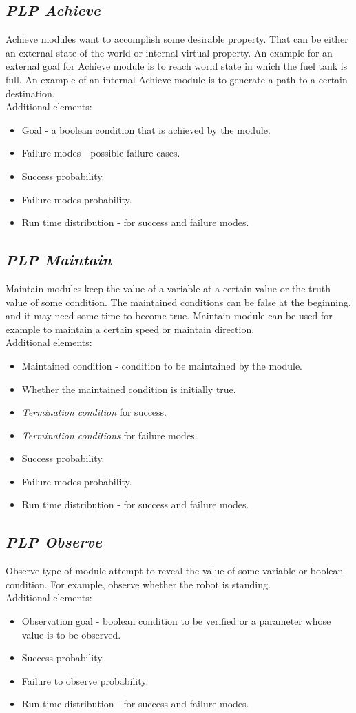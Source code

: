 \subsection{\textit{PLP Achieve} \label{plp_achieve}}
Achieve modules want to accomplish some desirable property. That can be either an external state of the world or internal virtual property. An example for an external goal for Achieve module is to reach world state in which the fuel tank is full. An example of an internal Achieve module is to generate a path to a certain destination.\\
Additional elements:
\begin{itemize}
\item Goal - a boolean condition that is achieved by the module.
\item Failure modes - possible failure cases.
\item Success probability.
\item Failure modes probability.
\item Run time distribution - for success and failure modes.
\end{itemize}
\subsection{\textit{PLP Maintain}  \label{plp_maintain}}
Maintain modules keep the value of a variable at a certain value or the truth value of some condition. The maintained conditions can be false at the beginning, and it may need some time to become true. Maintain module can be used for example to maintain a certain speed or maintain direction.\\
Additional elements:
\begin{itemize}
\item Maintained condition - condition to be maintained by the module.
\item Whether the maintained condition is initially true. 
\item \textit{Termination condition} for success.
\item \textit{Termination conditions} for failure modes.
\item Success probability.
\item Failure modes probability.
\item Run time distribution - for success and failure modes.
\end{itemize}
\subsection{\textit{PLP Observe} \label{plp_observe}}
Observe type of module attempt to reveal the value of some variable or boolean condition. For example, observe whether the robot is standing.\\
Additional elements:
\begin{itemize}
\item Observation goal - boolean condition to be verified or a parameter whose value is to be observed.
\item Success probability.
\item Failure to observe probability.
\item Run time distribution - for success and failure modes.
\end{itemize}
